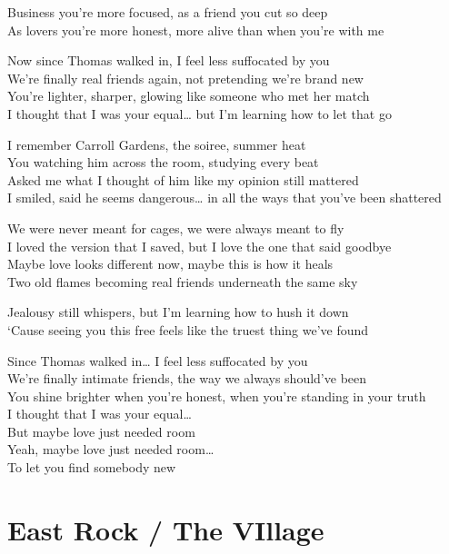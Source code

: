 \begin{lyrics}
Business you’re more focused, as a friend you cut so deep\\
As lovers you’re more honest, more alive than when you’re with me

Now since Thomas walked in, I feel less suffocated by you\\
We’re finally real friends again, not pretending we’re brand new\\
You’re lighter, sharper, glowing like someone who met her match\\
I thought that I was your equal… but I’m learning how to let that go

I remember Carroll Gardens, the soiree, summer heat\\
You watching him across the room, studying every beat\\
Asked me what I thought of him like my opinion still mattered\\
I smiled, said he seems dangerous… in all the ways that you’ve been shattered

We were never meant for cages, we were always meant to fly\\
I loved the version that I saved, but I love the one that said goodbye\\
Maybe love looks different now, maybe this is how it heals\\
Two old flames becoming real friends underneath the same sky

Jealousy still whispers, but I’m learning how to hush it down\\
‘Cause seeing you this free feels like the truest thing we’ve found

Since Thomas walked in… I feel less suffocated by you\\
We’re finally intimate friends, the way we always should’ve been\\
You shine brighter when you’re honest, when you’re standing in your truth\\
I thought that I was your equal…\\
But maybe love just needed room\\
Yeah, maybe love just needed room…\\
To let you find somebody new

\end{lyrics}

\section{East Rock / The VIllage}

